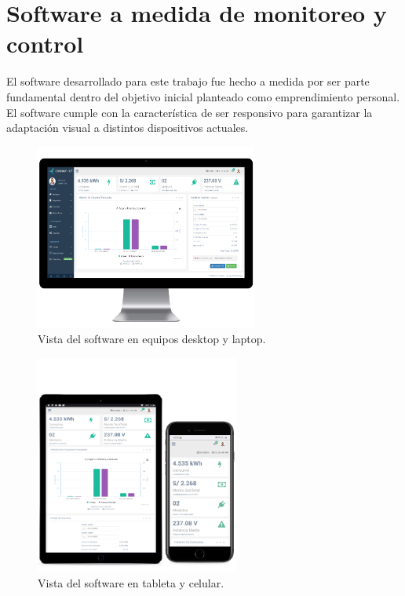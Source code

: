\section{Software a medida de monitoreo y control}

El software desarrollado para este trabajo fue hecho a medida por ser parte fundamental dentro del objetivo inicial planteado como emprendimiento personal. El software cumple con la característica de ser responsivo para garantizar la adaptación visual a distintos dispositivos actuales.

\begin{figure}[htpb]
\centering 
\includegraphics[width=0.65\textwidth]{./Figures/responsive1.png}
\caption{Vista del software en equipos desktop y laptop.}
\label{fig:software1}
\end{figure}

\begin{figure}[htpb]
\centering 
\includegraphics[width=0.6\textwidth]{./Figures/responsive2.png}
\caption{Vista del software en tableta y celular.}
\label{fig:software2}
\end{figure}